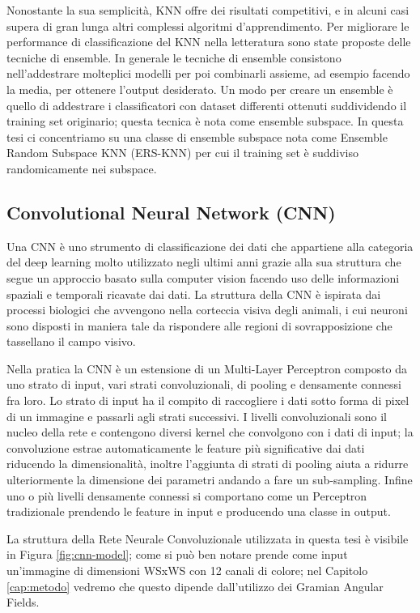 Nonostante la sua semplicità, KNN offre dei risultati competitivi, e in alcuni casi supera di gran lunga altri complessi algoritmi d'apprendimento. Per migliorare le performance di classificazione del 
KNN nella letteratura sono state proposte delle tecniche di ensemble. In generale le tecniche di ensemble consistono nell'addestrare molteplici modelli per poi combinarli assieme, ad 
esempio facendo la media, per ottenere l'output desiderato. Un modo per creare un ensemble è quello di addestrare i classificatori con dataset differenti ottenuti suddividendo il training set originario; 
questa tecnica è nota come ensemble subspace. In questa tesi ci concentriamo su una classe di ensemble subspace nota come Ensemble Random Subspace KNN (ERS-KNN) per cui il training set è suddiviso 
randomicamente nei subspace.

\subsection{Convolutional Neural Network (CNN)}

Una CNN è uno strumento di classificazione dei dati che appartiene alla categoria del deep learning molto utilizzato negli ultimi anni grazie alla sua struttura che segue un approccio basato sulla 
computer vision facendo uso delle informazioni spaziali e temporali ricavate dai dati. La struttura della CNN è ispirata dai processi biologici che avvengono nella corteccia visiva degli animali, 
i cui neuroni sono disposti in maniera tale da rispondere alle regioni di sovrapposizione che tassellano il campo visivo.

Nella pratica la CNN è un estensione di un Multi-Layer Perceptron composto da uno strato di input, vari strati convoluzionali, di pooling e densamente connessi fra loro. Lo strato di input ha il compito 
di raccogliere i dati sotto forma di pixel di un immagine e passarli agli strati successivi. I livelli convoluzionali sono il nucleo della rete e contengono diversi kernel che convolgono con i dati di 
input; la convoluzione estrae automaticamente le feature più significative dai dati riducendo la dimensionalità, inoltre l'aggiunta di strati di pooling aiuta a ridurre ulteriormente la dimensione dei parametri 
andando a fare un sub-sampling. Infine uno o più livelli densamente connessi si comportano come un Perceptron tradizionale prendendo le feature in input e producendo una classe in output.

La struttura della Rete Neurale Convoluzionale utilizzata in questa tesi è visibile in Figura \ref{fig:cnn-model}; come si può ben notare prende come input un'immagine di dimensioni WSxWS con 12 canali di colore; 
nel Capitolo \ref{cap:metodo} vedremo che questo dipende dall'utilizzo dei Gramian Angular Fields.

